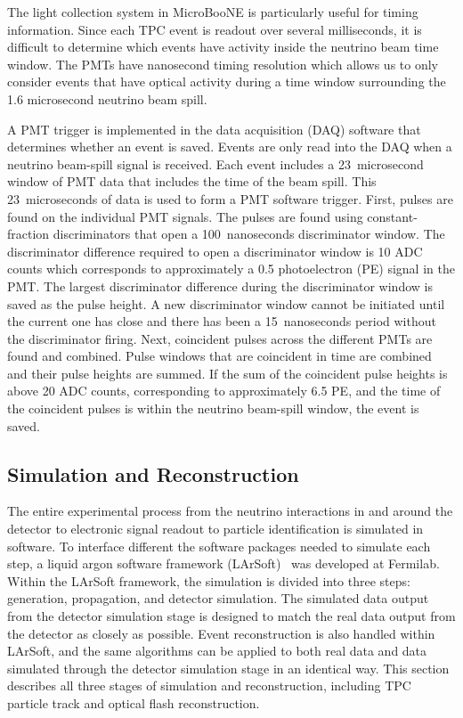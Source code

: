     The light collection system in MicroBooNE is particularly useful for timing
    information. Since each TPC event is readout over several milliseconds, it
    is difficult to determine which events have activity inside the neutrino
    beam time window. The PMTs have nanosecond timing resolution which allows
    us to only consider events that have optical activity during a time window
    surrounding the 1.6 microsecond neutrino beam spill. 

    A PMT trigger is implemented in the data acquisition (DAQ) software that
    determines whether an event is saved. Events are only read into the DAQ
    when a neutrino beam-spill signal is received. Each event includes a
    23~microsecond window of PMT data that includes the time of the beam spill.
    This 23~microseconds of data is used to form a PMT software trigger. First,
    pulses are found on the individual PMT signals. The pulses are found using
    constant-fraction discriminators that open a 100~nanoseconds discriminator
    window. The discriminator difference required to open a discriminator
    window is 10 ADC counts which corresponds to approximately a 0.5
    photoelectron (PE) signal in the PMT. The largest discriminator difference
    during the discriminator window is saved as the pulse height. A new
    discriminator window cannot be initiated until the current one has close
    and there has been a 15~nanoseconds period without the discriminator
    firing.  Next, coincident pulses across the different PMTs are found and
    combined.  Pulse windows that are coincident in time are combined and their
    pulse heights are summed. If the sum of the coincident pulse heights is
    above 20 ADC counts, corresponding to approximately 6.5 PE, and the time of
    the coincident pulses is within the neutrino beam-spill window, the event
    is saved.

    


\subsection{Simulation and Reconstruction}\label{sec:simreco}
  The entire experimental process from the neutrino interactions in and around
  the detector to electronic signal readout to particle identification is
  simulated in software. To interface different the software packages needed to
  simulate each step, a liquid argon software framework (LArSoft)~\cite{larsoft}
  was developed at Fermilab. Within the LArSoft framework, the simulation is
  divided into three steps: generation, propagation, and detector simulation.
  The simulated data output from the detector simulation stage is designed to
  match the real data output from the detector as closely as possible. Event
  reconstruction is also handled within LArSoft, and the same algorithms can be
  applied to both real data and data simulated through the detector simulation
  stage in an identical way. This section describes all three stages of
  simulation and reconstruction, including TPC particle track and optical flash
  reconstruction.

